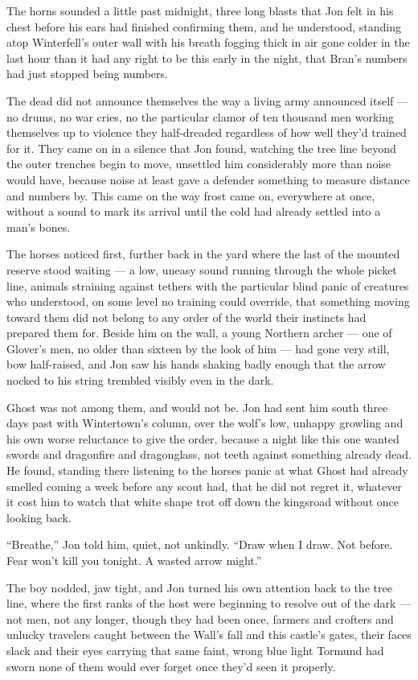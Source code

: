 The horns sounded a little past midnight, three long blasts that Jon felt in his chest before his ears had finished confirming them, and he understood, standing atop Winterfell’s outer wall with his breath fogging thick in air gone colder in the last hour than it had any right to be this early in the night, that Bran’s numbers had just stopped being numbers.

The dead did not announce themselves the way a living army announced itself — no drums, no war cries, no the particular clamor of ten thousand men working themselves up to violence they half-dreaded regardless of how well they’d trained for it. They came on in a silence that Jon found, watching the tree line beyond the outer trenches begin to move, unsettled him considerably more than noise would have, because noise at least gave a defender something to measure distance and numbers by. This came on the way frost came on, everywhere at once, without a sound to mark its arrival until the cold had already settled into a man’s bones.

The horses noticed first, further back in the yard where the last of the mounted reserve stood waiting — a low, uneasy sound running through the whole picket line, animals straining against tethers with the particular blind panic of creatures who understood, on some level no training could override, that something moving toward them did not belong to any order of the world their instincts had prepared them for. Beside him on the wall, a young Northern archer — one of Glover’s men, no older than sixteen by the look of him — had gone very still, bow half-raised, and Jon saw his hands shaking badly enough that the arrow nocked to his string trembled visibly even in the dark.

Ghost was not among them, and would not be. Jon had sent him south three days past with Wintertown’s column, over the wolf’s low, unhappy growling and his own worse reluctance to give the order, because a night like this one wanted swords and dragonfire and dragonglass, not teeth against something already dead. He found, standing there listening to the horses panic at what Ghost had already smelled coming a week before any scout had, that he did not regret it, whatever it cost him to watch that white shape trot off down the kingsroad without once looking back.

“Breathe,” Jon told him, quiet, not unkindly. “Draw when I draw. Not before. Fear won’t kill you tonight. A wasted arrow might.”

The boy nodded, jaw tight, and Jon turned his own attention back to the tree line, where the first ranks of the host were beginning to resolve out of the dark — not men, not any longer, though they had been once, farmers and crofters and unlucky travelers caught between the Wall’s fall and this castle’s gates, their faces slack and their eyes carrying that same faint, wrong blue light Tormund had sworn none of them would ever forget once they’d seen it properly.

